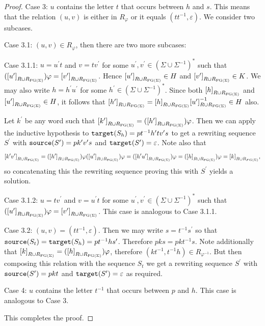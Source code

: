 \begin{proof}
  Case 3: $u$ contains the letter $t$ that occurs between $h$ and $s$. This means that the
  relation $(u, v)$ is either in $R_\varphi$ or it equals $(tt^{-1}, \varepsilon)$. We consider two subcases.

  Case 3.1: $(u, v) \in R_\varphi$, then there are two more subcases:

  Case 3.1.1: $u = u^\prime t$ and $v= tv^\prime$ for some $u^\prime, v^\prime \in {(\Sigma\cup\Sigma^{-1})}^\ast$
  such that $({[u^\prime]}_{R\cup R_{\textrm{FG}(\Sigma)}})\varphi = {[v^\prime]}_{R\cup R_{\textrm{FG}(\Sigma)}}$.
  Hence ${[u^\prime]}_{R\cup R_{\textrm{FG}(\Sigma)}} \in H$ and ${[v^\prime]}_{R\cup R_{\textrm{FG}(\Sigma)}}\in K$.
  We may also write $h = h^\prime u^\prime$ for some $h^\prime \in {(\Sigma\cup \Sigma^{-1})}^\ast$.
  Since both ${[h]}_{R\cup R_{\textrm{FG}(\Sigma)}}$ and ${[u^\prime]}_{R\cup R_{\textrm{FG}(\Sigma)}} \in H$, it follows that
  ${[h^\prime]}_{R\cup R_{\textrm{FG}(\Sigma)}} = {[h]}_{R\cup R_{\textrm{FG}(\Sigma)}}{[u^\prime]}_{R\cup R_{\textrm{FG}(\Sigma)}}^{-1}\in H$
  also.

  Let $k^\prime$ be any word such that
  ${[k^\prime]}_{R\cup R_{\textrm{FG}(\Sigma)}} = ({[h^\prime]}_{R\cup R_{\textrm{FG}(\Sigma)}})\varphi$.
  Then we can apply the inductive hypothesis to $\texttt{target}(S_h) = pt^{-1} h^\prime t v^\prime s$ to get a rewriting
  sequence $S^\prime$ with $\texttt{source}(S^\prime) = pk^\prime v^\prime s$ and
  $\texttt{target}(S^\prime) = \varepsilon$. Note also that
  \[
    {[k^\prime v^\prime]}_{R\cup R_{\textrm{FG}(\Sigma)}} =
    ({[h^\prime]}_{R\cup R_{\textrm{FG}(\Sigma)}})\varphi({[u^\prime]}_{R\cup R_{\textrm{FG}(\Sigma)}})\varphi =
    ({[h^\prime u^\prime]}_{R\cup R_{\textrm{FG}(\Sigma)}})\varphi = ({[h]}_{R\cup R_{\textrm{FG}(\Sigma)}})\varphi =
    {[k]}_{R\cup R_{FG(\Sigma)}},
  \]
  so concatenating this the rewriting sequence proving this with $S^\prime$ yields a solution.

  Case 3.1.2:  $u = tv^\prime$ and $v= u^\prime t$ for some $u^\prime, v^\prime \in {(\Sigma\cup\Sigma^{-1})}^\ast$
  such that $({[u^\prime]}_{R\cup R_{\textrm{FG}(\Sigma)}})\varphi = {[v^\prime]}_{R\cup R_{\textrm{FG}(\Sigma)}}$.
  This case is analogous to Case 3.1.1.

  Case 3.2: $(u, v) = (tt^{-1}, \varepsilon)$. Then we may write $s = t^{-1}s^\prime$
  so that $\texttt{source}(S_t) = \texttt{target}(S_h) = pt^{-1}hs^\prime$.
  Therefore $pks = pkt^{-1}s$. Note additionally that
  ${[k]}_{R\cup R_{\textrm{FG}(\Sigma)}} = ({[h]}_{R\cup R_{\textrm{FG}(\Sigma)}})\varphi$, therefore
  $(kt^{-1}, t^{-1}h) \in R_{\varphi^{-1}}$. But then composing this relation with the sequence
  $S_t$ we get a rewriting sequence $S^\prime$ with $\texttt{source}(S^\prime) = pkt$ and
  $\texttt{target}(S^\prime) = \varepsilon$ as required.

  Case 4: $u$ contains the letter $t^{-1}$ that occurs between $p$ and $h$. This case is analogous to Case 3.

  This completes the proof.
\end{proof}

